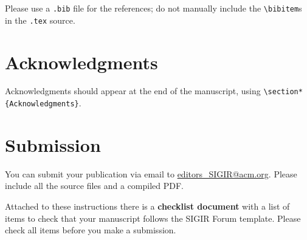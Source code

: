 \documentclass[news]{sigirforum}
\begin{document}
Please use a \texttt{.bib} file for the references; do not manually include the \texttt{\textbackslash bibitem}s in the \texttt{.tex} source.

\section{Acknowledgments}

Acknowledgments should appear at the end of the manuscript, using \texttt{\textbackslash section*\{Acknowledgments\}}.

\section{Submission}

You can submit your publication via email to \url{editors\_SIGIR@acm.org}. Please include all the source files and a compiled PDF.

Attached to these instructions there is a \textbf{checklist document} with a list of items to check that your manuscript follows the SIGIR Forum template. Please check all items before you make a submission.


\end{document}

